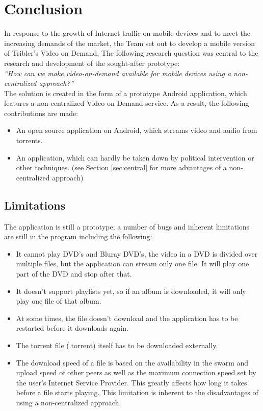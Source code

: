 \section{Conclusion}
\thispagestyle{fancy}
In response to the growth of Internet traffic on mobile devices and to meet the increasing demands of the market, the Team set out to develop a mobile version of Tribler's Video on Demand. The following research question was central to the research and development of the sought-after prototype: \\

\textit{``How can we make video-on-demand available for mobile devices using a non-centralized approach?''}\\

The solution is created in the form of a prototype Android application, which features a non-centralized Video on Demand service. As a result, the following contributions are made:
\begin{itemize}
\item An open source application on Android, which streams video and audio from torrents.
\item An application, which can hardly be taken down by political intervention or other techniques. (see Section \ref{sec:central} for more advantages of a non-centralized approach)
\end{itemize}

\subsection{Limitations}
The application is still a prototype; a number of bugs and inherent limitations are still in the program including the following:

\begin{itemize}
\item It cannot play DVD's and Bluray DVD's, the video in a DVD is divided over multiple files, but the application can stream only one file. It will play one part of the DVD and stop after that.
\item It doesn't support playlists yet, so if an album is downloaded, it will only play one file of that album.
\item At some times, the file doesn't download and the application has to be restarted before it downloads again.
\item The torrent file (.torrent) itself has to be downloaded externally.
\item The download speed of a file is based on the availability in the swarm and upload speed of other peers as well as the maximum connection speed set by the user's Internet Service Provider. This greatly affects how long it takes before a file starts playing. This limitation is inherent to the disadvantages of using a non-centralized approach.
\end{itemize}
